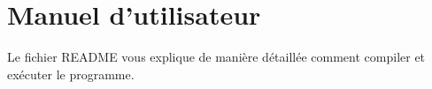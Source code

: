 \documentclass[11pt,a4paper]{article}
\begin{document}


\appendix 
\renewcommand{\thesubsection}{\Alph{section}.\arabic{subsection}}

\section{Manuel d'utilisateur} \label{app:annexe}
Le fichier README vous explique de manière détaillée comment compiler et exécuter le programme.


\end{document}
